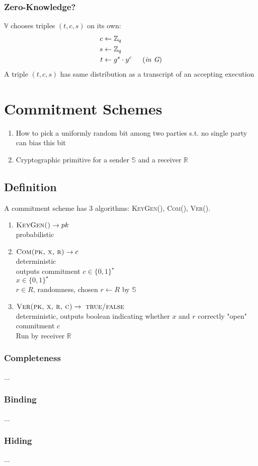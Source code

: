 \documentclass{report}
\begin{document}
			\subsubsection{Zero-Knowledge?}
			\startsubsection
				$\mathbb{V}$ chooses triples $(t,c,s)$ on its own:
				\begin{align*}
					c & \leftarrow \mathbb{Z}_q \\
					s & \leftarrow \mathbb{Z}_q \\
					t & \leftarrow g^s \cdot y^c \indent (\textit{in G})\\
				\end{align*}
				A triple $(t,c,s)$ has same distribution as a transcript of an accepting execution
			\closesection
		\closesection
	\closesection
	
	\section{Commitment Schemes}
	\startsection
		\begin{enumerate}[-]
			\item How to pick a uniformly random bit among two parties s.t. no single party can bias this bit
			\item Cryptographic primitive for a sender $\mathbb{S}$ and a receiver $\mathbb{R}$
		\end{enumerate}
		\subsection{Definition}
		\startsubsection
			A commitment scheme has 3 algorithms: \textsc{KeyGen()}, \textsc{Com()}, \textsc{Ver()}.
			\begin{enumerate}
				\item $\textsc{KeyGen()} \rightarrow pk$ \\
				\indent probabilistic
				\item $\textsc{Com(pk, x, r)} \rightarrow c$ \\
				\indent deterministic \\
				\indent outputs commitment $c \in \{ 0,1 \} ^{\star}$ \\
				\indent $x \in \{ 0,1 \} ^{\star}$ \\
				\indent $r \in R$, randomness, chosen $r \leftarrow R$ by $\mathbb{S}$
				\item $\textsc{Ver(pk, x, r, c)} \rightarrow \ \textsc{true/false}$ \\
				\indent deterministic, outputs boolean indicating whether $x$ and $r$ correctly "open" commitment $c$ \\
				\indent Run by receiver $\mathbb{R}$
			\end{enumerate}
			\subsubsection{Completeness}
			\startsubsection
				...
			\closesection
			\subsubsection{Binding}
			\startsubsection
				...
			\closesection
			\subsubsection{Hiding}
			\startsubsection
				...
			\closesection
		\closesection
	\closesection
\end{document}
